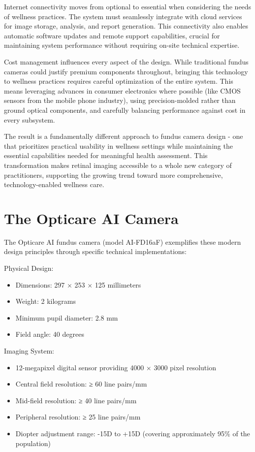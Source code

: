 \documentclass[
  Letterpaper,
]{scrbook}
\providecommand{\tightlist}{%
  \setlength{\itemsep}{0pt}\setlength{\parskip}{0pt}}\usepackage{longtable,booktabs,array}
\begin{document}
Internet connectivity moves from optional to essential when considering
the needs of wellness practices. The system must seamlessly integrate
with cloud services for image storage, analysis, and report generation.
This connectivity also enables automatic software updates and remote
support capabilities, crucial for maintaining system performance without
requiring on-site technical expertise.

Cost management influences every aspect of the design. While traditional
fundus cameras could justify premium components throughout, bringing
this technology to wellness practices requires careful optimization of
the entire system. This means leveraging advances in consumer
electronics where possible (like CMOS sensors from the mobile phone
industry), using precision-molded rather than ground optical components,
and carefully balancing performance against cost in every subsystem.

The result is a fundamentally different approach to fundus camera design
- one that prioritizes practical usability in wellness settings while
maintaining the essential capabilities needed for meaningful health
assessment. This transformation makes retinal imaging accessible to a
whole new category of practitioners, supporting the growing trend toward
more comprehensive, technology-enabled wellness care.

\section{The Opticare AI Camera}\label{the-opticare-ai-camera}

The Opticare AI fundus camera (model AI-FD16aF) exemplifies these modern
design principles through specific technical implementations:

Physical Design:

\begin{itemize}
\tightlist
\item
  Dimensions: 297 × 253 × 125 millimeters
\item
  Weight: 2 kilograms
\item
  Minimum pupil diameter: 2.8 mm
\item
  Field angle: 40 degrees
\end{itemize}

Imaging System:

\begin{itemize}
\tightlist
\item
  12-megapixel digital sensor providing 4000 × 3000 pixel resolution
\item
  Central field resolution: ≥ 60 line pairs/mm
\item
  Mid-field resolution: ≥ 40 line pairs/mm
\item
  Peripheral resolution: ≥ 25 line pairs/mm
\item
  Diopter adjustment range: -15D to +15D (covering approximately 95\% of
  the population)
\end{itemize}
\end{document}
